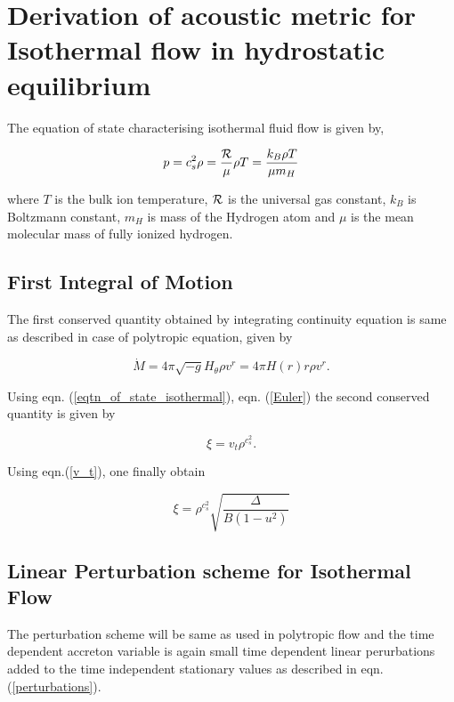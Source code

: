 \documentclass[12pt]{article}
\begin{document}
\section{Derivation of acoustic metric for Isothermal flow in hydrostatic equilibrium}
The equation of state characterising isothermal fluid flow
is given by,

\begin{equation}\label{eqtn_of_state_isothermal}
p=c_s^2\rho=\frac{\cal R}{\mu}\rho T=\frac{k_B\rho T}{\mu m_H}
\end{equation}

\noindent
where $T$ is the bulk ion temperature, $\cal R$ is the universal gas constant, $k_B$ is Boltzmann constant, $m_H$ is mass of the Hydrogen atom and $\mu$ is the mean molecular mass of fully ionized hydrogen.

\subsection{First Integral of Motion}
The first conserved quantity obtained by integrating continuity equation is same as described in case of polytropic equation, given by

\begin{equation}\label{Sationary-mass-acc-rate}
\dot{M} = 4\pi \sqrt{-g}H_\theta  \rho v^r = 4\pi H(r) r \rho v^r.
\end{equation}

Using eqn. (\ref{eqtn_of_state_isothermal}), eqn. (\ref{Euler}) the second conserved quantity is given by

\begin{equation}\label{conserved_isothermal}
\xi=v_t \rho^{c_s^2}.
\end{equation}

Using eqn.(\ref{v_t}), one finally obtain 

\begin{equation}
\xi= \rho^{c_s^2} \sqrt{\frac{\Delta}{B(1-u^2)}}
\end{equation}


\subsection{Linear Perturbation scheme for Isothermal Flow}
The perturbation scheme will be same as used in polytropic flow and the time dependent accreton variable is again small time dependent linear perurbations added to the time independent stationary values as described in eqn. (\ref{perturbations}).\\
\end{document}
